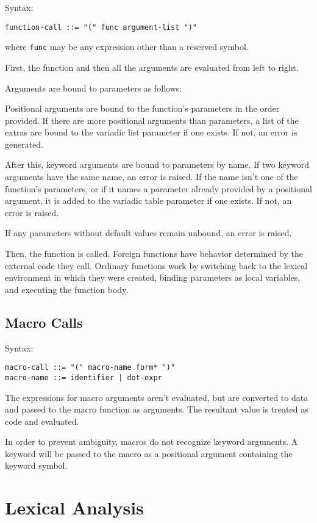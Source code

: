 \documentclass[11pt]{article}
\begin{document}
Syntax:
\begin{verbatim}
function-call ::= "(" func argument-list ")"
\end{verbatim}
where \texttt{func} may be any expression other than a reserved symbol.

First, the function and then all the arguments are evaluated from left to right.

Arguments are bound to parameters as follows:

Positional arguments are bound to the function's parameters in the order
provided. If there are more positional arguments than parameters, a list of the
extras are bound to the variadic list parameter if one exists. If not, an error
is generated.

After this, keyword arguments are bound to parameters by name. If two keyword
arguments have the same name, an error is raised. If the name isn't one of the
function's parameters, or if it names a parameter already provided by a
positional argument, it is added to the variadic table parameter if one exists.
If not, an error is raised.

If any parameters without default values remain unbound, an error is raised.

Then, the function is called. Foreign functions have behavior determined by the
external code they call. Ordinary functions work by switching back to the
lexical environment in which they were created, binding parameters as local
variables, and executing the function body.


\subsection{Macro Calls}
\label{sec:orga472829}

Syntax:
\begin{verbatim}
macro-call ::= "(" macro-name form* ")"
macro-name ::= identifier | dot-expr
\end{verbatim}

The expressions for macro arguments aren't evaluated, but are converted to data
and passed to the macro function as arguments. The resultant value is treated as
code and evaluated.

In order to prevent ambiguity, macros do not recognize keyword arguments. A
keyword will be passed to the macro as a positional argument containing the
keyword symbol.


\section{Lexical Analysis}
\label{sec:orgaaae3dc}
\end{document}
